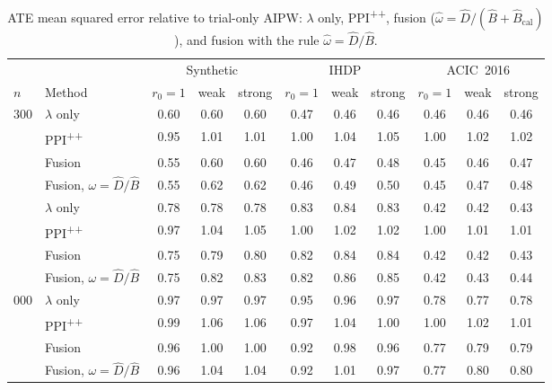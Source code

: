 \begin{table}[h]
\caption{ATE mean squared error relative to trial-only AIPW: $\lambda$ only, PPI\textsuperscript{++}, fusion ($\hat\omega=\hat D/(\hat B+\hat B_{\mathrm{cal}})$), and fusion with the rule $\hat\omega=\hat D/\hat B$.}
\label{tab:ate-extra}
\begin{center}\footnotesize
\begin{tabular}{@{}llccccccccc@{}}
\toprule
& & \multicolumn{3}{c}{Synthetic} & \multicolumn{3}{c}{IHDP} & \multicolumn{3}{c}{ACIC~2016}\\
\cmidrule(lr){3-5}\cmidrule(lr){6-8}\cmidrule(lr){9-11}
$n$ & Method & $r_0{=}1$ & weak & strong & $r_0{=}1$ & weak & strong & $r_0{=}1$ & weak & strong\\
\midrule
300 & $\lambda$ only & 0.60 & 0.60 & 0.60 & 0.47 & 0.46 & 0.46 & 0.46 & 0.46 & 0.46 \\
 & PPI\textsuperscript{++} & 0.95 & 1.01 & 1.01 & 1.00 & 1.04 & 1.05 & 1.00 & 1.02 & 1.02 \\
 & Fusion & 0.55 & 0.60 & 0.60 & 0.46 & 0.47 & 0.48 & 0.45 & 0.46 & 0.47 \\
 & Fusion, $\omega=\hat D/\hat B$ & 0.55 & 0.62 & 0.62 & 0.46 & 0.49 & 0.50 & 0.45 & 0.47 & 0.48 \\
\addlinespace
900 & $\lambda$ only & 0.78 & 0.78 & 0.78 & 0.83 & 0.84 & 0.83 & 0.42 & 0.42 & 0.43 \\
 & PPI\textsuperscript{++} & 0.97 & 1.04 & 1.05 & 1.00 & 1.02 & 1.02 & 1.00 & 1.01 & 1.01 \\
 & Fusion & 0.75 & 0.79 & 0.80 & 0.82 & 0.84 & 0.84 & 0.42 & 0.42 & 0.43 \\
 & Fusion, $\omega=\hat D/\hat B$ & 0.75 & 0.82 & 0.83 & 0.82 & 0.86 & 0.85 & 0.42 & 0.43 & 0.44 \\
\addlinespace
3{,}000 & $\lambda$ only & 0.97 & 0.97 & 0.97 & 0.95 & 0.96 & 0.97 & 0.78 & 0.77 & 0.78 \\
 & PPI\textsuperscript{++} & 0.99 & 1.06 & 1.06 & 0.97 & 1.04 & 1.00 & 1.00 & 1.02 & 1.01 \\
 & Fusion & 0.96 & 1.00 & 1.00 & 0.92 & 0.98 & 0.96 & 0.77 & 0.79 & 0.79 \\
 & Fusion, $\omega=\hat D/\hat B$ & 0.96 & 1.04 & 1.04 & 0.92 & 1.01 & 0.97 & 0.77 & 0.80 & 0.80 \\
\bottomrule
\end{tabular}
\end{center}
\end{table}
